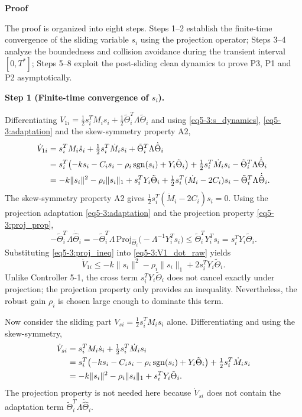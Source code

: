 \noindent\textbf{Proof}

The proof is organized into eight steps. Steps 1--2 establish the finite-time convergence of the
sliding variable $s_i$ using the projection operator; Steps 3--4 analyze the boundedness and
collision avoidance during the transient interval $[0,T^*]$; Steps 5--8 exploit the post-sliding
clean dynamics to prove P3, P1 and P2 asymptotically.

\medskip\noindent\textbf{Step 1 (Finite-time convergence of $s_i$).}

Differentiating $V_{1i} = \frac12 s_i^T M_i s_i + \frac12 \tilde{\Theta}_i^T \Lambda \tilde{\Theta}_i$
and using \eqref{eq5-3:s_dynamics}, \eqref{eq5-3:adaptation} and the skew-symmetry property A2,
\begin{align}
	\dot{V}_{1i}
	&= s_i^T M_i \dot{s}_i + \tfrac12 s_i^T \dot{M}_i s_i
		+ \tilde{\Theta}_i^T \Lambda \dot{\tilde{\Theta}}_i \notag\\
	&= s_i^T\bigl(-k s_i - C_i s_i - \rho_i\,\mathrm{sgn}(s_i) + Y_i\tilde{\Theta}_i\bigr)
		+ \tfrac12 s_i^T \dot{M}_i s_i
		- \tilde{\Theta}_i^T \Lambda \dot{\hat{\Theta}}_i \notag\\
	&= -k\|s_i\|^2 - \rho_i\|s_i\|_1 + s_i^T Y_i\tilde{\Theta}_i
		+ \tfrac12 s_i^T(\dot{M}_i - 2C_i)s_i
		- \tilde{\Theta}_i^T \Lambda \dot{\hat{\Theta}}_i. \label{eq5-3:V1_dot_raw}
\end{align}
The skew-symmetry property A2 gives $\tfrac12 s_i^T(\dot{M}_i - 2C_i)s_i = 0$.
Using the projection adaptation \eqref{eq5-3:adaptation} and the projection property
\eqref{eq5-3:proj_prop},
\begin{equation}
	-\tilde{\Theta}_i^T \Lambda \dot{\hat{\Theta}}_i
	= -\tilde{\Theta}_i^T \Lambda\,\mathrm{Proj}_{\hat{\Theta}_i}\bigl(-\Lambda^{-1}Y_i^T s_i\bigr)
	\le \tilde{\Theta}_i^T Y_i^T s_i = s_i^T Y_i\tilde{\Theta}_i. \label{eq5-3:proj_ineq}
\end{equation}
Substituting \eqref{eq5-3:proj_ineq} into \eqref{eq5-3:V1_dot_raw} yields
\begin{equation}
	\dot{V}_{1i} \le -k\|s_i\|^2 - \rho_i\|s_i\|_1 + 2 s_i^T Y_i\tilde{\Theta}_i. \label{eq5-3:V1_dot_proj}
\end{equation}
\noindent Unlike Controller 5-1, the cross term $s_i^T Y_i\tilde{\Theta}_i$ does not cancel
exactly under projection; the projection property only provides an inequality.
Nevertheless, the robust gain $\rho_i$ is chosen large enough to dominate this term.

Now consider the sliding part $V_{si} = \frac12 s_i^T M_i s_i$ alone.
Differentiating and using the skew-symmetry,
\begin{align}
	\dot{V}_{si}
	&= s_i^T M_i \dot{s}_i + \tfrac12 s_i^T \dot{M}_i s_i \notag\\
	&= s_i^T\bigl(-k s_i - C_i s_i - \rho_i\,\mathrm{sgn}(s_i) + Y_i\tilde{\Theta}_i\bigr)
		+ \tfrac12 s_i^T \dot{M}_i s_i \notag\\
	&= -k\|s_i\|^2 - \rho_i\|s_i\|_1 + s_i^T Y_i\tilde{\Theta}_i. \label{eq5-3:Vs_dot}
\end{align}
The projection property is not needed here because $\dot{V}_{si}$ does not contain the
adaptation term $\tilde{\Theta}_i^T \Lambda \dot{\hat{\Theta}}_i$.

